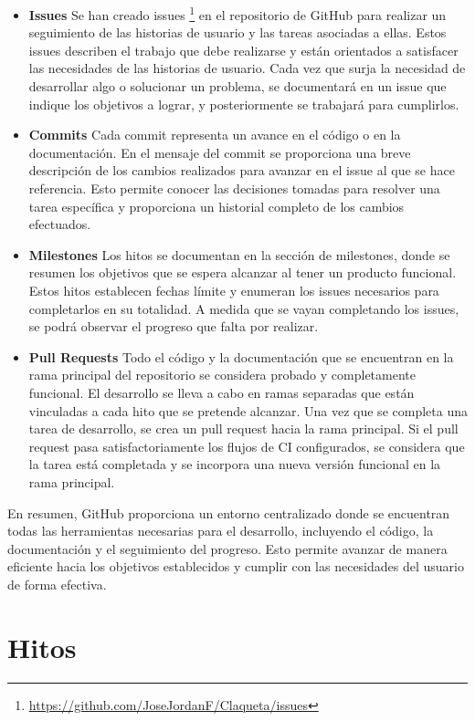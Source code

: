 \begin{itemize}
\item \textbf{Issues} Se han creado issues \footnote{\url{https://github.com/JoseJordanF/Claqueta/issues}} en el repositorio de GitHub para realizar un seguimiento de las historias de usuario y las tareas asociadas a ellas. Estos issues describen el trabajo que debe realizarse y están orientados a satisfacer las necesidades de las historias de usuario. Cada vez que surja la necesidad de desarrollar algo o solucionar un problema, se documentará en un issue que indique los objetivos a lograr, y posteriormente se trabajará para cumplirlos.
\item \textbf{Commits} Cada commit representa un avance en el código o en la documentación. En el mensaje del commit se proporciona una breve descripción de los cambios realizados para avanzar en el issue al que se hace referencia. Esto permite conocer las decisiones tomadas para resolver una tarea específica y proporciona un historial completo de los cambios efectuados.
\item \textbf{Milestones} Los hitos se documentan en la sección de milestones, donde se resumen los objetivos que se espera alcanzar al tener un producto funcional. Estos hitos establecen fechas límite y enumeran los issues necesarios para completarlos en su totalidad. A medida que se vayan completando los issues, se podrá observar el progreso que falta por realizar.
\item \textbf{Pull Requests} Todo el código y la documentación que se encuentran en la rama principal del repositorio se considera probado y completamente funcional. El desarrollo se lleva a cabo en ramas separadas que están vinculadas a cada hito que se pretende alcanzar. Una vez que se completa una tarea de desarrollo, se crea un pull request hacia la rama principal. Si el pull request pasa satisfactoriamente los flujos de CI configurados, se considera que la tarea está completada y se incorpora una nueva versión funcional en la rama principal.
\end{itemize}

En resumen, GitHub proporciona un entorno centralizado donde se encuentran todas las herramientas necesarias para el desarrollo, incluyendo el código, la documentación y el seguimiento del progreso. Esto permite avanzar de manera eficiente hacia los objetivos establecidos y cumplir con las necesidades del usuario de forma efectiva.

\section{Hitos}

